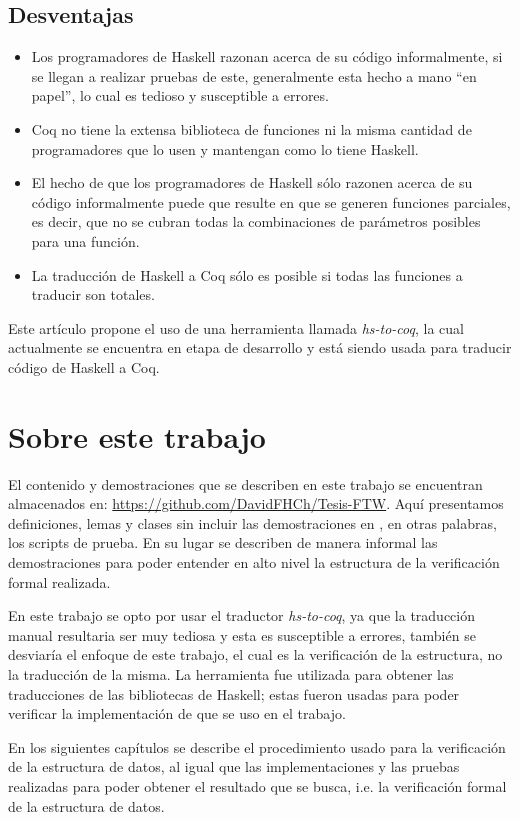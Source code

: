 \subsection{Desventajas}
\begin{itemize}
    \item Los programadores de Haskell razonan acerca de su código informalmente, si se llegan a
    realizar pruebas de este, generalmente esta hecho a mano ``en papel'', lo cual es tedioso y
    susceptible a errores.
    \item Coq no tiene la extensa biblioteca de funciones ni la misma cantidad de programadores
    que lo usen y mantengan como lo tiene Haskell.
    \item El hecho de que los programadores de Haskell s\'olo razonen acerca de su código
    informalmente puede que resulte en que se generen funciones parciales, es decir, que no se
    cubran todas la combinaciones de parámetros posibles para una funci\'on.
    \item La traducci\'on de Haskell a Coq s\'olo es posible si todas las funciones a traducir son
    totales.
\end{itemize}

Este art\'iculo propone el uso de una herramienta llamada \textit{hs-to-coq}, la cual actualmente se
encuentra en etapa de desarrollo y est\'a siendo usada para traducir código de Haskell a Coq.

\section{Sobre este trabajo}
El contenido y demostraciones que se describen en este trabajo se encuentran almacenados en:
\url{https://github.com/DavidFHCh/Tesis-FTW}. Aqu\'i presentamos definiciones, lemas y clases sin
incluir las demostraciones en {\coq}, en otras palabras, los scripts de prueba. En su lugar se describen de manera informal las demostraciones para poder entender en alto nivel la estructura de la verificaci\'on formal realizada.

En este trabajo se opto por usar el traductor \textit{hs-to-coq}, ya que la traducci\'on manual
resultaria ser muy tediosa y esta es susceptible a errores, tambi\'en se desviaría el enfoque de
este trabajo, el cual es la verificaci\'on de la estructura, no la traducci\'on de la misma. La
herramienta fue utilizada para obtener las traducciones de las bibliotecas de Haskell; estas fueron
usadas para poder verificar la implementación de {\arns} \cite{MSetRBT} que se uso en el trabajo.

En los siguientes capítulos se describe el procedimiento usado para la verificaci\'on de la
estructura de datos, al igual que las implementaciones y las pruebas realizadas para poder obtener
el resultado que se busca, i.e. la verificación formal de la estructura de datos.
